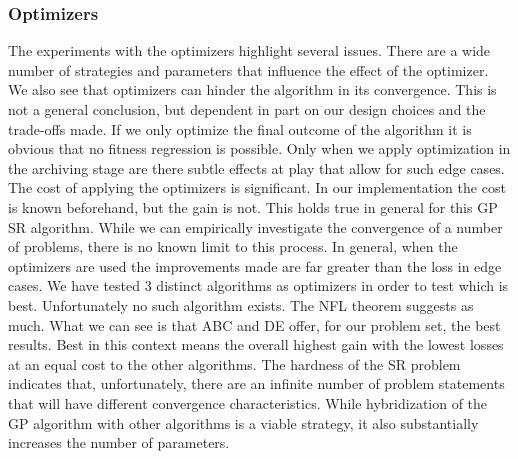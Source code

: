 \subsubsection{Optimizers}
The experiments with the optimizers highlight several issues. There are a wide number of strategies and parameters that influence the effect of the optimizer. We also see that optimizers can hinder the algorithm in its convergence. This is not a general conclusion, but dependent in part on our design choices and the trade-offs made. If we only optimize the final outcome of the algorithm it is obvious that no fitness regression is possible. Only when we apply optimization in the archiving stage are there subtle effects at play that allow for such edge cases. The cost of applying the optimizers is significant. In our implementation the cost is known beforehand, but the gain is not. This holds true in general for this GP SR algorithm. While we can empirically investigate the convergence of a number of problems, there is no known limit to this process. 
In general, when the optimizers are used the improvements made are far greater than the loss in edge cases. We have tested 3 distinct algorithms as optimizers in order to test which is best. Unfortunately no such algorithm exists. The NFL theorem \cite{NFL} suggests as much. What we can see is that ABC and DE offer, for our problem set, the best results. Best in this context means the overall highest gain with the lowest losses at an equal cost to the other algorithms. The hardness of the SR problem indicates that, unfortunately, there are an infinite number of problem statements that will have different convergence characteristics. While hybridization of the GP algorithm with other algorithms is a viable strategy, it also substantially increases the number of parameters. 